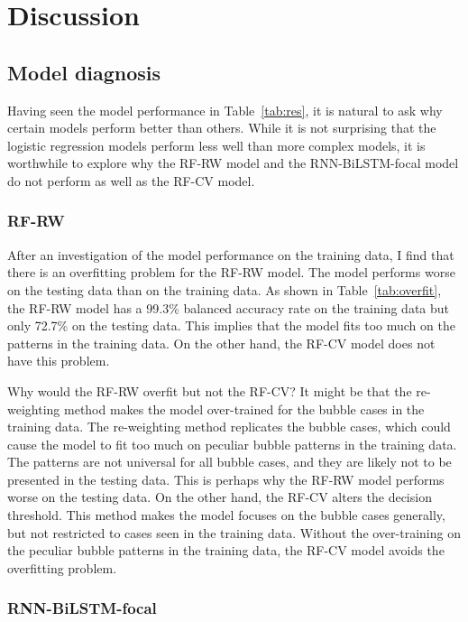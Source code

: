 \documentclass[12pt, man, a4paper, floatsintext]{apa7}
\begin{document}
    \section{Discussion}

\subsection{Model diagnosis}

Having seen the model performance in Table~\ref{tab:res}, it is natural to ask why certain models perform better than others. While it is not surprising that the logistic regression models perform less well than more complex models, it is worthwhile to explore why the RF-RW model and the RNN-BiLSTM-focal model do not perform as well as the RF-CV model.

\subsubsection{RF-RW}

After an investigation of the model performance on the training data, I find that there is an overfitting problem for the RF-RW model. The model performs worse on the testing data than on the training data. As shown in Table~\ref{tab:overfit}, the RF-RW model has a 99.3\% balanced accuracy rate on the training data but only 72.7\% on the testing data. This implies that the model fits too much on the patterns in the training data. On the other hand, the RF-CV model does not have this problem.



Why would the RF-RW overfit but not the RF-CV? It might be that the re-weighting method makes the model over-trained for the bubble cases in the training data. The re-weighting method replicates the bubble cases, which could cause the model to fit too much on peculiar bubble patterns in the training data. The patterns are not universal for all bubble cases, and they are likely not to be presented in the testing data. This is perhaps why the RF-RW model performs worse on the testing data. On the other hand, the RF-CV alters the decision threshold. This method makes the model focuses on the bubble cases generally, but not restricted to cases seen in the training data. Without the over-training on the peculiar bubble patterns in the training data, the RF-CV model avoids the overfitting problem.

\subsubsection{RNN-BiLSTM-focal}
\end{document}
